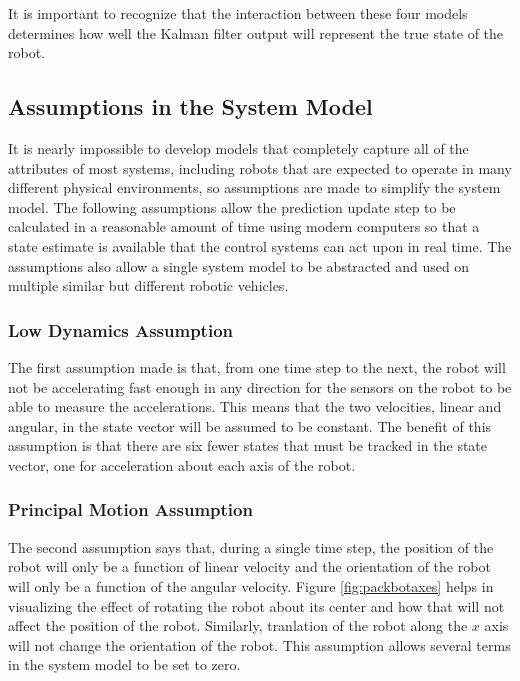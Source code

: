 It is important to recognize that the interaction between these four models determines how well the Kalman filter output will represent the true state of the robot.

\subsection{Assumptions in the System Model}
\label{sec:kfAssumptions}
It is nearly impossible to develop models that completely capture all of the attributes of most systems, including robots that are expected to operate in many different physical environments, so assumptions are made to simplify the system model. The following assumptions allow the prediction update step to be calculated in a reasonable amount of time using modern computers so that a state estimate is available that the control systems can act upon in real time. The assumptions also allow a single system model to be abstracted and used on multiple similar but different robotic vehicles.

\subsubsection{Low Dynamics Assumption}
\label{sec:kfLowDynamicsAssumption}
The first assumption made is that, from one time step to the next, the robot will not be accelerating fast enough in any direction for the sensors on the robot to be able to measure the accelerations. This means that the two velocities, linear and angular, in the state vector will be assumed to be constant. The benefit of this assumption is that there are six fewer states that must be tracked in the state vector, one for acceleration about each axis of the robot.

\subsubsection{Principal Motion Assumption}
\label{sec:kfPrincipalMotionAssumption}
The second assumption says that, during a single time step, the position of the robot will only be a function of linear velocity and the orientation of the robot will only be a function of the angular velocity. Figure \ref{fig:packbotaxes} helps in visualizing the effect of rotating the robot about its center and how that will not affect the position of the robot. Similarly, tranlation of the robot along the $x$ axis will not change the orientation of the robot. This assumption allows several terms in the system model to be set to zero.

